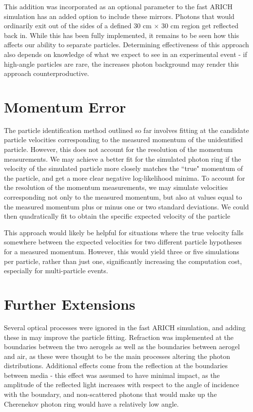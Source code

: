 This addition was incorporated as an optional parameter to the fast ARICH simulation has an added option to include these mirrors.
Photons that would ordinarily exit out of the sides of a defined 30 cm $\times$ 30 cm region get reflected back in.
While this has been fully implemented, it remains to be seen how this affects our ability to separate particles.
Determining effectiveness of this approach also depends on knowledge of what we expect to see in an experimental event - if high-angle particles are rare, the increases photon background may render this approach counterproductive.

\section{Momentum Error}
The particle identification method outlined so far involves fitting at the candidate particle velocities corresponding to the measured momentum of the unidentified particle.
However, this does not account for the resolution of the momentum measurements.
We may achieve a better fit for the simulated photon ring if the velocity of the simulated particle more closely matches the ``true" momentum of the particle, and get a more clear negative log-likelihood minima. 
To account for the resolution of the momentum measurements, we may simulate velocities corresponding not only to the measured momentum, but also at values equal to the measured momentum plus or minus one or two standard deviations.
We could then quadratically fit to obtain the specific expected velocity of the particle

This approach would likely be helpful for situations where the true velocity falls somewhere between the expected velocities for two different particle hypotheses for a measured momentum.  
However, this would yield three or five simulations per particle, rather than just one, significantly increasing the computation cost, especially for multi-particle events. 

\section{Further Extensions}
Several optical processes were ignored in the fast ARICH simulation, and adding these in may improve the particle fitting. 
Refraction was implemented at the boundaries between the two aerogels as well as the boundaries between aerogel and air, as these were thought to be the main processes altering the photon distributions.
Additional effects come from the reflection at the boundaries between media - this effect was assumed to have minimal impact, as the amplitude of the reflected light increases with respect to the angle of incidence with the boundary, and non-scattered photons that would make up the Cherenekov photon ring would have a relatively low angle.

